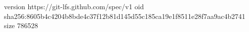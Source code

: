 version https://git-lfs.github.com/spec/v1
oid sha256:8605b4c4204b8bde4c37f12b81d145d55c185ca19e1f8511e28f7aa9ac4b2741
size 786528

